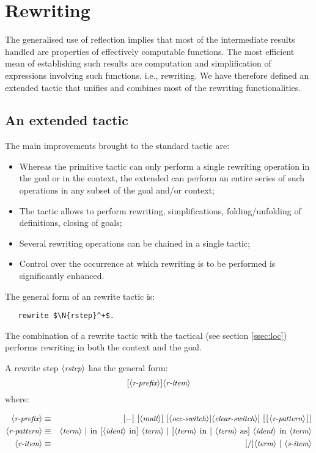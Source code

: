 \section{Rewriting}\label{sec:rw}
The generalised use of reflection implies that most of the
intermediate results handled are properties of effectively computable
functions. The most efficient mean of establishing such results are
computation and simplification of expressions involving such
functions, i.e., rewriting. We have therefore defined an extended
 tactic that unifies and combines most of the rewriting
functionalities.
\subsection{An extended  tactic}\label{ssec:extrw}
The main improvements brought to the standard \Coq{} 
tactic are:
\begin{itemize}
\item Whereas the primitive  tactic can only perform a
  single rewriting
operation in the goal or in the context, the extended 
can perform an entire series of such operations in any subset of the
goal and/or context;
\item The \ssr{}  tactic allows to perform rewriting,
  simplifications, folding/unfolding of definitions, closing of goals;
\item Several rewriting operations can be chained in a single tactic;
\item Control over the occurrence at which rewriting is to be performed is
  significantly enhanced.
\end{itemize}


The general form of an \ssr{} rewrite tactic is:
\begin{lstlisting}
   rewrite $\N{rstep}^+$.
\end{lstlisting}
The combination of a rewrite tactic with the  tactical (see
section \ref{ssec:loc}) performs rewriting in both the context and the
goal.

A rewrite step $\langle\mbox{\itshape\rmfamily\small rstep}\rangle$ has the general form:
$$[\langle\mbox{\itshape\rmfamily\small r-prefix}\rangle]\langle\mbox{\itshape\rmfamily\small r-item}\rangle$$
where:

\begin{eqnarray*}
\N{r-prefix} & \equiv &
[\C{-}]\ [\N{mult}]\ [\N{occ-switch} | \N{clear-switch}]\ [\C{[}\N{r-pattern}\C{]}]\\
\N{r-pattern} & \equiv &
   \N{term}\ |\ \C{in}\ [\N{ident}\ \C{in}]\ \N{term} \ 
   |\ [\N{term}\ \C{in}\ |\ \N{term}\ \C{as}]\ \N{ident}\ \C{in}\ \N{term}\\
\N{r-item} & \equiv &
 [\C{/}]\N{term} \ |\ \N{s-item} \\
\end{eqnarray*}


